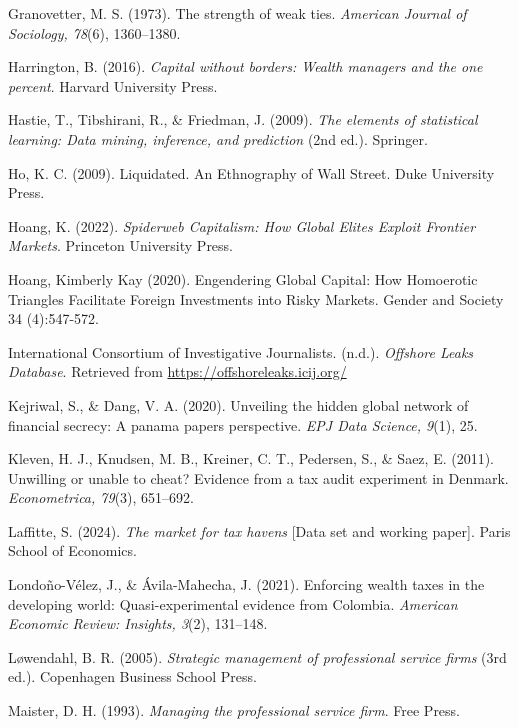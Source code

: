 \begin{thebibliography}{99}
Granovetter, M. S. (1973). The strength of weak ties. \textit{American Journal of Sociology, 78}(6), 1360–1380. 

Harrington, B. (2016). \textit{Capital without borders: Wealth managers and the one percent}. Harvard University Press.

Hastie, T., Tibshirani, R., \& Friedman, J. (2009). \textit{The elements of statistical learning: Data mining, inference, and prediction} (2nd ed.). Springer.

Ho, K. C. (2009). Liquidated. An Ethnography of Wall Street. Duke University Press.

Hoang, K. (2022). \textit{Spiderweb Capitalism: How Global Elites Exploit Frontier Markets}. Princeton University Press.

Hoang, Kimberly Kay (2020). Engendering Global Capital: How Homoerotic Triangles Facilitate Foreign Investments into Risky Markets. Gender and Society 34 (4):547-572.

International Consortium of Investigative Journalists. (n.d.). \textit{Offshore Leaks Database}. Retrieved from \url{https://offshoreleaks.icij.org/}

Kejriwal, S., \& Dang, V. A. (2020). Unveiling the hidden global network of financial secrecy: A panama papers perspective. \textit{EPJ Data Science, 9}(1), 25. 

Kleven, H. J., Knudsen, M. B., Kreiner, C. T., Pedersen, S., \& Saez, E. (2011). Unwilling or unable to cheat? Evidence from a tax audit experiment in Denmark. \textit{Econometrica, 79}(3), 651–692. 

Laffitte, S. (2024). \textit{The market for tax havens} [Data set and working paper]. Paris School of Economics.

Londo{\~n}o-V{\'e}lez, J., \& {\'A}vila-Mahecha, J. (2021). Enforcing wealth taxes in the developing world: Quasi-experimental evidence from Colombia. \textit{American Economic Review: Insights, 3}(2), 131–148. 

L{\o}wendahl, B. R. (2005). \textit{Strategic management of professional service firms} (3rd ed.). Copenhagen Business School Press.

Maister, D. H. (1993). \textit{Managing the professional service firm}. Free Press.


\end{thebibliography}
